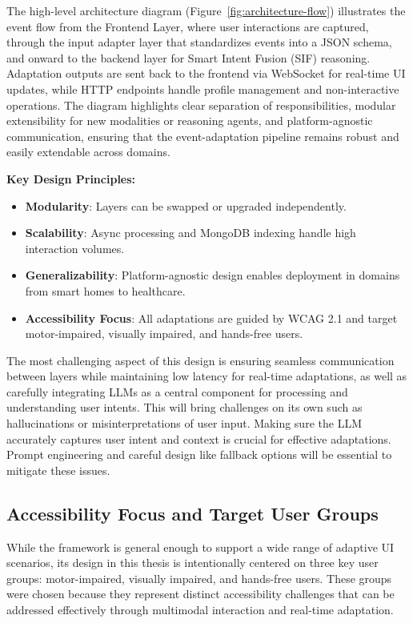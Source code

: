 \newpage
The high-level architecture diagram (Figure~\ref{fig:architecture-flow}) illustrates the event flow from the Frontend Layer, where user interactions are captured, through the input adapter layer that standardizes events into a JSON schema, and onward to the backend layer for Smart Intent Fusion (SIF) reasoning. Adaptation outputs are sent back to the frontend via WebSocket for real-time UI updates, while HTTP endpoints handle profile management and non-interactive operations. The diagram highlights clear separation of responsibilities, modular extensibility for new modalities or reasoning agents, and platform-agnostic communication, ensuring that the event-adaptation pipeline remains robust and easily extendable across domains.

\textbf{Key Design Principles:}
\begin{itemize}
\item \textbf{Modularity}: Layers can be swapped or upgraded independently.
\item \textbf{Scalability}: Async processing and MongoDB indexing handle high interaction volumes.
\item \textbf{Generalizability}: Platform-agnostic design enables deployment in domains from smart homes to healthcare.
\item \textbf{Accessibility Focus}: All adaptations are guided by WCAG 2.1 and target motor-impaired, visually impaired, and hands-free users.
\end{itemize}

The most challenging aspect of this design is ensuring seamless communication between layers while maintaining low latency for real-time adaptations, as well as carefully integrating LLMs as a central component for processing and understanding user intents. This will bring challenges on its own such as hallucinations or misinterpretations of user input. Making sure the LLM accurately captures user intent and context is crucial for effective adaptations. Prompt engineering and careful design like fallback options will be essential to mitigate these issues.

\subsection{Accessibility Focus and Target User Groups}
While the framework is general enough to support a wide range of adaptive UI scenarios, its design in this thesis is intentionally centered on three key user groups: motor-impaired, visually impaired, and hands-free users. These groups were chosen because they represent distinct accessibility challenges that can be addressed effectively through multimodal interaction and real-time adaptation.

